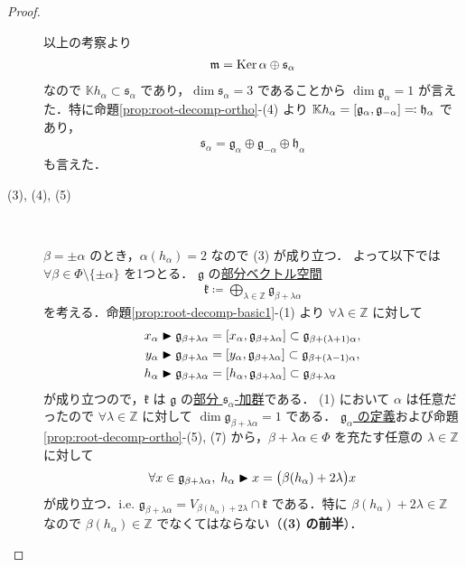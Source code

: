 \documentclass[rep_main]{subfiles}
\begin{document}
\begin{proof}
\begin{description}
		以上の考察より
		\begin{align}
			\mathfrak{m} = \operatorname{Ker} \alpha \oplus \mathfrak{s}_\alpha
		\end{align}
		なので $\mathbb{K}h_\alpha \subset \mathfrak{s}_\alpha$ であり，$\dim \mathfrak{s}_\alpha = 3$ であることから $\dim \mathfrak{g}_{\alpha} = 1$ が言えた．特に命題\ref{prop:root-decomp-ortho}-(4) より $\mathbb{K}h_\alpha = \comm{\mathfrak{g}_{\alpha}}{\mathfrak{g}_{-\alpha}} \eqqcolon \mathfrak{h}_\alpha$ であり，
		\begin{align}
			\mathfrak{s}_\alpha = \mathfrak{g}_{\alpha} \oplus \mathfrak{g}_{-\alpha} \oplus \mathfrak{h}_{\alpha}
		\end{align}
		も言えた．
		\item[(3), (4), (5)]　
		
		$\beta = \pm \alpha$ のとき，$\alpha(h_\alpha) = 2$ なので (3) が成り立つ．
		よって以下では $\forall \beta \in \Phi \setminus \{\pm \alpha\}$ を1つとる．
		$\mathfrak{g}$ の\underline{部分ベクトル空間}
		\begin{align}
			\mathfrak{k} \coloneqq \bigoplus_{\lambda \in \mathbb{Z}} \mathfrak{g}_{\beta + \lambda \alpha}
		\end{align}
		を考える．命題\ref{prop:root-decomp-basic1}-(1) より $\forall \lambda \in \mathbb{Z}$ に対して
		\begin{align}
			x_\alpha \btr \mathfrak{g}_{\beta + \lambda\alpha} &= \comm{x_\alpha}{\mathfrak{g}_{\beta + \lambda\alpha}} \subset \mathfrak{g}_{\beta + (\lambda+1)\alpha}, \\
			y_\alpha \btr \mathfrak{g}_{\beta + \lambda\alpha} &= \comm{y_\alpha}{\mathfrak{g}_{\beta + \lambda\alpha}} \subset \mathfrak{g}_{\beta + (\lambda-1)\alpha}, \\
			h_\alpha \btr \mathfrak{g}_{\beta + \lambda\alpha} &= \comm{h_\alpha}{\mathfrak{g}_{\beta + \lambda\alpha}} \subset \mathfrak{g}_{\beta + \lambda\alpha}
		\end{align}
		が成り立つので，$\mathfrak{k}$ は $\mathfrak{g}$ の\hyperref[def:sub-g-module]{部分 $\mathfrak{s}_\alpha$-加群}である．
		(1) において $\alpha$ は任意だったので $\forall \lambda \in \mathbb{Z}$ に対して $\dim \mathfrak{g}_{\beta + \lambda \alpha} = 1$ である．
		\hyperref[def:ga]{$\mathfrak{g}_\alpha$ の定義}および命題\ref{prop:root-decomp-ortho}-(5), (7) から，$\beta + \lambda\alpha \in \Phi$ を充たす任意の $\lambda \in \mathbb{Z}$ に対して
		\begin{align}
			\forall x \in \mathfrak{g}_{\beta + \lambda\alpha},\; h_\alpha \blacktriangleright x = \bigl(\beta(h_\alpha) + 2\lambda\bigr)x
		\end{align}
		が成り立つ．i.e. $\mathfrak{g}_{\beta + \lambda\alpha} = V_{\beta(h_\alpha) + 2\lambda} \cap \mathfrak{k}$ である．特に $\beta(h_\alpha) + 2\lambda \in \mathbb{Z}$ なので $\beta(h_\alpha) \in \mathbb{Z}$ でなくてはならない（\textbf{(3) の前半}）．
		

\end{description}
\end{proof}
\end{document}
